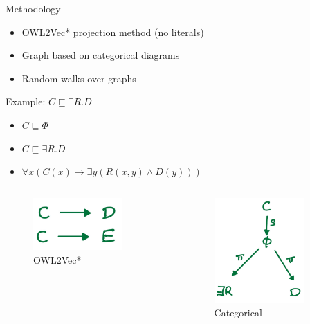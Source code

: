 \documentclass[bigger]{beamer}
\begin{document}
\begin{frame}[label={sec:org1028660}]{Methodology}
\begin{itemize}
\item OWL2Vec* projection method (no literals)
\item Graph based on categorical diagrams

\item Random walks over graphs
\end{itemize}
\end{frame}

\begin{frame}[label={sec:orgf43fe29}]{Example: \(C \sqsubseteq \exists R. D\)}
\begin{itemize}
\item \(C \sqsubseteq \Phi\)
\item \(C \sqsubseteq \exists R. D\)
\item \(\forall x (C(x) \to \exists y(R(x,y) \land D(y)))\)
\end{itemize}




\begin{columns}
\begin{column}{0.5\columnwidth}
\begin{figure}[htbp]
\centering
\includegraphics[height=2cm]{imgs/owl2vec1.jpg}
\caption{\label{fig:org8bf5cf9}OWL2Vec*}
\end{figure}
\end{column}

\begin{column}{0.5\columnwidth}
\begin{figure}[htbp]
\centering
\includegraphics[height=4cm]{imgs/cat1.jpg}
\caption{\label{fig:orga93999a}Categorical}
\end{figure}
\end{column}
\end{columns}
\end{frame}
\end{document}
